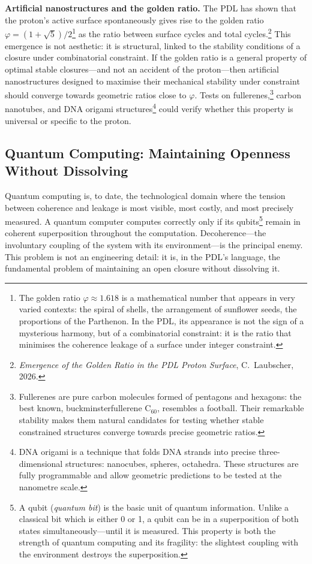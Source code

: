 \documentclass[12pt, a4paper, openright]{book}
\begin{document}
\textbf{Artificial nanostructures and the golden ratio.} The PDL has shown that the proton's active surface spontaneously gives rise to the golden ratio $\varphi = (1+\sqrt{5})/2$\footnote{The golden ratio $\varphi \approx 1.618$ is a mathematical number that appears in very varied contexts: the spiral of shells, the arrangement of sunflower seeds, the proportions of the Parthenon. In the PDL, its appearance is not the sign of a mysterious harmony, but of a combinatorial constraint: it is the ratio that minimises the coherence leakage of a surface under integer constraint.} as the ratio between surface cycles and total cycles.\footnote{\textit{Emergence of the Golden Ratio in the PDL Proton Surface}, C.~Laubscher, 2026.} This emergence is not aesthetic: it is structural, linked to the stability conditions of a closure under combinatorial constraint. If the golden ratio is a general property of optimal stable closures---and not an accident of the proton---then artificial nanostructures designed to maximise their mechanical stability under constraint should converge towards geometric ratios close to $\varphi$. Tests on fullerenes,\footnote{Fullerenes are pure carbon molecules formed of pentagons and hexagons: the best known, buckminsterfullerene C$_{60}$, resembles a football. Their remarkable stability makes them natural candidates for testing whether stable constrained structures converge towards precise geometric ratios.} carbon nanotubes, and DNA origami structures\footnote{DNA origami is a technique that folds DNA strands into precise three-dimensional structures: nanocubes, spheres, octahedra. These structures are fully programmable and allow geometric predictions to be tested at the nanometre scale.} could verify whether this property is universal or specific to the proton.

\subsection*{Quantum Computing: Maintaining Openness Without Dissolving}

Quantum computing is, to date, the technological domain where the tension between coherence and leakage is most visible, most costly, and most precisely measured. A quantum computer computes correctly only if its qubits\footnote{A qubit (\textit{quantum bit}) is the basic unit of quantum information. Unlike a classical bit which is either 0 or 1, a qubit can be in a superposition of both states simultaneously---until it is measured. This property is both the strength of quantum computing and its fragility: the slightest coupling with the environment destroys the superposition.} remain in coherent superposition throughout the computation. Decoherence---the involuntary coupling of the system with its environment---is the principal enemy. This problem is not an engineering detail: it is, in the PDL's language, the fundamental problem of maintaining an open closure without dissolving it.
\end{document}
